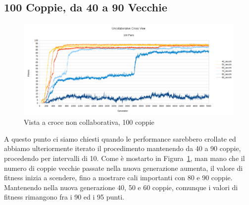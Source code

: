 \subsection{100 Coppie, da 40 a 90 Vecchie}
\begin{figure}[ht]
	\centering
	\includegraphics[scale=0.7,angle=90]{imgs/cross_nc_100_pairs_40_90_old.png}
	\caption{Vista a croce non collaborativa, 100 coppie}
	\label{figure:cross_nc_100_40_90}
\end{figure}
A questo punto ci siamo chiesti quando le performance sarebbero crollate ed
abbiamo ulteriormente iterato il procedimento mantenendo da 40 a 90 coppie,
procedendo per intervalli di 10.\newline
Come è mostarto in Figura~\ref{figure:cross_nc_100_40_90}, man mano che il
numero di coppie vecchie passate nella nuova generazione aumenta, il valore di
fitness inizia a scendere, fino a mostrare cali importanti con 80 e 90 coppie.
Mantenendo nella nuova generazione 40, 50 e 60 coppie, comunque i valori di
fitness rimangono fra i 90 ed i 95 punti.

\clearpage

